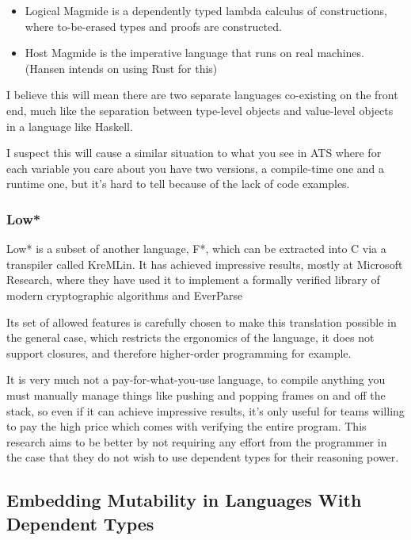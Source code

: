\documentclass[12pt,twoside]{report}
\begin{document}
\begin{itemize}
  \item Logical Magmide is a dependently typed lambda calculus of constructions, where to-be-erased types and proofs are constructed.
  \item Host Magmide is the imperative language that runs on real machines. (Hansen intends on using Rust for this)
\end{itemize}

I believe this will mean there are two separate languages co-existing on the front end, much like the separation between type-level objects and value-level objects in a language like Haskell.

I suspect this will cause a similar situation to what you see in ATS where for each variable you care about you have two versions, a compile-time one and a runtime one, but it's hard to tell because of the lack of code examples.

\subsubsection{Low*}
Low*\citep{protzenko_low_2017} is a subset of another language, F*, which can be extracted into C via a transpiler called KreMLin. It has achieved impressive results, mostly at Microsoft Research, where they have used it to implement a formally verified library of modern cryptographic algorithms\citep{star_2024} and EverParse

Its set of allowed features is carefully chosen to make this translation possible in the general case, which restricts the ergonomics of the language, it does not support closures, and therefore higher-order programming for example.

It is very much not a pay-for-what-you-use language, to compile anything you must manually manage things like pushing and popping frames on and off the stack, so even if it can achieve impressive results, it's only useful for teams willing to pay the high price which comes with verifying the entire program. This research aims to be better by not requiring any effort from the programmer in the case that they do not wish to use dependent types for their reasoning power.

\subsection{Embedding Mutability in Languages With Dependent Types}
\end{document}
